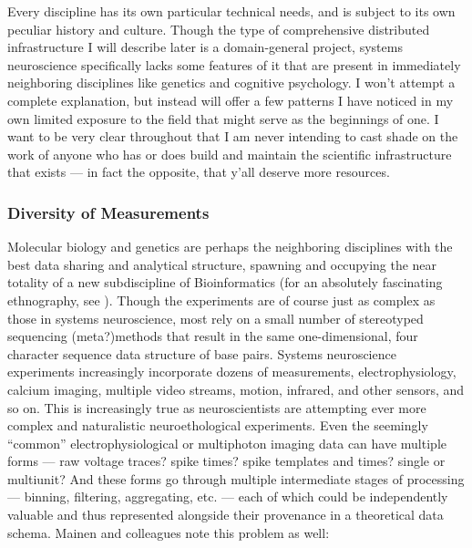 \documentclass[11pt]{article}
\begin{document}
\begin{multicols}{2}


Every discipline has its own particular technical needs, and is subject
to its own peculiar history and culture. Though the type of
comprehensive distributed infrastructure I will describe later is a
domain-general project, systems neuroscience specifically lacks some
features of it that are present in immediately neighboring disciplines
like genetics and cognitive psychology. I won't attempt a complete
explanation, but instead will offer a few patterns I have noticed in my
own limited exposure to the field that might serve as the beginnings of
one. I want to be very clear throughout that I am never intending to
cast shade on the work of anyone who has or does build and maintain the
scientific infrastructure that exists --- in fact the opposite, that
y'all deserve more resources.

\hypertarget{diversity-of-measurements}{%
\subsubsection{Diversity of
Measurements}\label{diversity-of-measurements}}

Molecular biology and genetics are perhaps the neighboring disciplines
with the best data sharing and analytical structure, spawning and
occupying the near totality of a new subdiscipline of Bioinformatics
(for an absolutely fascinating ethnography, see \cite{bietzCollaborationMetagenomicsSequence2009} ). Though the experiments
are of course just as complex as those in systems neuroscience, most
rely on a small number of stereotyped sequencing (meta?)methods that
result in the same one-dimensional, four character sequence data
structure of base pairs. Systems neuroscience experiments increasingly
incorporate dozens of measurements, electrophysiology, calcium imaging,
multiple video streams, motion, infrared, and other sensors, and so on.
This is increasingly true as neuroscientists are attempting ever more
complex and naturalistic neuroethological experiments. Even the
seemingly ``common'' electrophysiological or multiphoton imaging data
can have multiple forms --- raw voltage traces? spike times? spike
templates and times? single or multiunit? And these forms go through
multiple intermediate stages of processing --- binning, filtering,
aggregating, etc. --- each of which could be independently valuable and
thus represented alongside their provenance in a theoretical data
schema. Mainen and colleagues note this problem as well:


\end{multicols}
\end{document}
